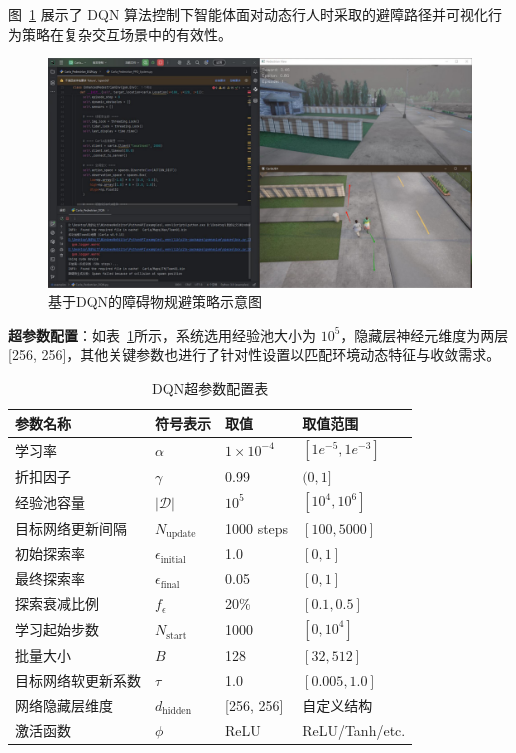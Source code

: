 图~\ref{fig:avoidance} 展示了 DQN 算法控制下智能体面对动态行人时采取的避障路径并可视化行为策略在复杂交互场景中的有效性。

\begin{figure}[H]
    \centering
    \includegraphics[width=1\textwidth]{images/pedestrian_avoidance.pdf}
    \caption{基于DQN的障碍物规避策略示意图}
    \label{fig:avoidance}
\end{figure}

\textbf{超参数配置}：如表~\ref{tab:dqn_params}所示，系统选用经验池大小为 $10^5$，隐藏层神经元维度为两层 [256, 256]，其他关键参数也进行了针对性设置以匹配环境动态特征与收敛需求。

\begin{table}[H]
\centering
\caption{DQN超参数配置表}
\label{tab:dqn_params}
\begin{tabular}{llll}
\toprule
参数名称 & 符号表示 & 取值 & 取值范围 \\
\midrule
学习率 & $\alpha$ & $1 \times 10^{-4}$ & $[1e^{-5}, 1e^{-3}]$ \\
折扣因子 & $\gamma$ & 0.99 & $(0, 1]$ \\
经验池容量 & $|\mathcal{D}|$ & $10^5$ & $[10^4, 10^6]$ \\
目标网络更新间隔 & $N_{\text{update}}$ & 1000 steps & $[100, 5000]$ \\
初始探索率 & $\epsilon_{\text{initial}}$ & 1.0 & $[0, 1]$ \\
最终探索率 & $\epsilon_{\text{final}}$ & 0.05 & $[0, 1]$ \\
探索衰减比例 & $f_{\epsilon}$ & 20\% & $[0.1, 0.5]$ \\
学习起始步数 & $N_{\text{start}}$ & 1000 & $[0, 10^4]$ \\
批量大小 & $B$ & 128 & $[32, 512]$ \\
目标网络软更新系数 & $\tau$ & 1.0 & $[0.005, 1.0]$ \\
网络隐藏层维度 & $d_{\text{hidden}}$ & [256, 256] & 自定义结构 \\
激活函数 & $\phi$ & ReLU & ReLU/Tanh/etc. \\
\bottomrule
\end{tabular}
\end{table}

